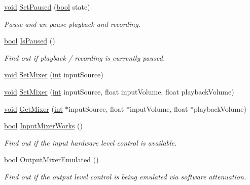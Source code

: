 \begin{DoxyCompactItemize}
\hyperlink{sound_8c_ae35f5844602719cf66324f4de2a658b3}{void} \hyperlink{class_audio_i_o_a49f8574c7ce8410e3ab254fe95c44388}{Set\+Paused} (\hyperlink{mac_2config_2i386_2lib-src_2libsoxr_2soxr-config_8h_abb452686968e48b67397da5f97445f5b}{bool} state)
\begin{DoxyCompactList}\small\item\em Pause and un-\/pause playback and recording. \end{DoxyCompactList}\item 
\hyperlink{mac_2config_2i386_2lib-src_2libsoxr_2soxr-config_8h_abb452686968e48b67397da5f97445f5b}{bool} \hyperlink{class_audio_i_o_aa83356a7bb2153f67f4c82b72ed5185b}{Is\+Paused} ()
\begin{DoxyCompactList}\small\item\em Find out if playback / recording is currently paused. \end{DoxyCompactList}\item 
\hyperlink{sound_8c_ae35f5844602719cf66324f4de2a658b3}{void} \hyperlink{class_audio_i_o_ab90a44dee504b8748bf321416a25067b}{Set\+Mixer} (\hyperlink{xmltok_8h_a5a0d4a5641ce434f1d23533f2b2e6653}{int} input\+Source)
\item 
\hyperlink{sound_8c_ae35f5844602719cf66324f4de2a658b3}{void} \hyperlink{class_audio_i_o_a6e08d80f05a4106be20dfaa96723c957}{Set\+Mixer} (\hyperlink{xmltok_8h_a5a0d4a5641ce434f1d23533f2b2e6653}{int} input\+Source, float input\+Volume, float playback\+Volume)
\item 
\hyperlink{sound_8c_ae35f5844602719cf66324f4de2a658b3}{void} \hyperlink{class_audio_i_o_a2341f380ecf5d7630ed1879a1b66e28c}{Get\+Mixer} (\hyperlink{xmltok_8h_a5a0d4a5641ce434f1d23533f2b2e6653}{int} $\ast$input\+Source, float $\ast$input\+Volume, float $\ast$playback\+Volume)
\item 
\hyperlink{mac_2config_2i386_2lib-src_2libsoxr_2soxr-config_8h_abb452686968e48b67397da5f97445f5b}{bool} \hyperlink{class_audio_i_o_a104cc037e35b66adb8864a35e8376f8e}{Input\+Mixer\+Works} ()
\begin{DoxyCompactList}\small\item\em Find out if the input hardware level control is available. \end{DoxyCompactList}\item 
\hyperlink{mac_2config_2i386_2lib-src_2libsoxr_2soxr-config_8h_abb452686968e48b67397da5f97445f5b}{bool} \hyperlink{class_audio_i_o_abc4c1f9f7609603270df993ee8af1af2}{Output\+Mixer\+Emulated} ()
\begin{DoxyCompactList}\small\item\em Find out if the output level control is being emulated via software attenuation. \end{DoxyCompactList}\item 

\end{DoxyCompactItemize}
